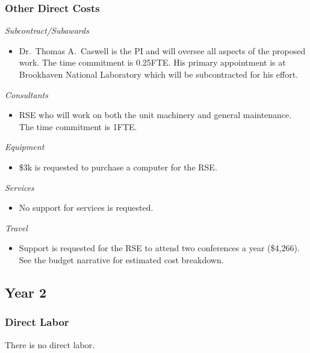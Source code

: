 \documentclass[12pt]{article}
\numberwithin{page}{section}
\begin{document}
\subsubsection{Other Direct Costs}
\textit{Subcontract/Subawards}
\begin{itemize}
\item Dr.\ Thomas A.\ Caswell is the PI and will oversee all aspects of the
  proposed work.  The time commitment is 0.25FTE.  His primary
  appointment is at Brookhaven National Laboratory which will be
  subcontracted for his effort.
\end{itemize}
\textit{Consultants}
\begin{itemize}
\item RSE who will work on both the unit machinery and general
  maintenance.  The time commitment is 1FTE.
\end{itemize}
\textit{Equipment}
\begin{itemize}
\item \$3k is requested to purchase a computer for the RSE.
\end{itemize}
\textit{Services}
\begin{itemize}
\item No support for services is requested.
\end{itemize}
\textit{Travel}
\begin{itemize}
\item Support is requested for the RSE to attend two conferences a
  year (\$4,266).  See the budget narrative for estimated cost
  breakdown.
\end{itemize}
\subsection{Year 2}
\subsubsection{Direct Labor}
There is no direct labor.
\end{document}
